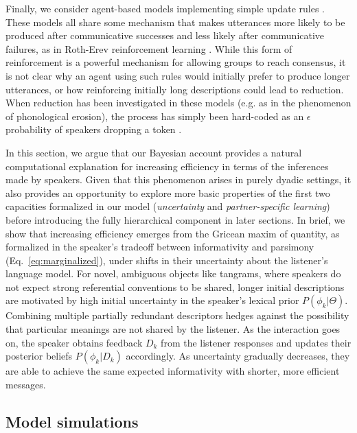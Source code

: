 Finally, we consider agent-based models implementing simple update rules \cite{steels_self-organizing_1995,barr_establishing_2004,young_evolution_2015}.
These models all share some mechanism that makes utterances more likely to be produced after communicative successes and less likely after communicative failures, as in Roth-Erev reinforcement learning \cite{erev1998predicting}.
While this form of reinforcement is a powerful mechanism for allowing groups to reach consensus, it is not clear why an agent using such rules would initially prefer to produce longer utterances, or how reinforcing initially long descriptions could lead to reduction. %
When reduction has been investigated in these models (e.g. as in the phenomenon of phonological erosion), the process has simply been hard-coded as an $\epsilon$ probability of speakers dropping a token \cite{beuls2013agent,steels2016agent}.

In this section, we argue that our Bayesian account provides a natural computational explanation for increasing efficiency in terms of the inferences made by speakers.
Given that this phenomenon arises in purely dyadic settings, it also provides an opportunity to explore more basic properties of the first two capacities formalized in our model (\emph{uncertainty} and \emph{partner-specific learning}) before introducing the fully hierarchical component in later sections. 
In brief, we show that increasing efficiency emerges from the Gricean maxim of quantity, as formalized in the speaker's tradeoff between informativity and parsimony (Eq.~\ref{eq:marginalized}), under shifts in their uncertainty about the listener's language model. 
For novel, ambiguous objects like tangrams, where speakers do not expect strong referential conventions to be shared, longer initial descriptions are motivated by high initial uncertainty in the speaker's lexical prior $P(\phi_k | \Theta)$. 
Combining multiple partially redundant descriptors hedges against the possibility that particular meanings are not shared by the listener.
As the interaction goes on, the speaker obtains feedback $D_k$ from the listener responses and updates their posterior beliefs $P(\phi_k | D_k)$ accordingly. 
As uncertainty gradually decreases, they are able to achieve the same expected informativity with shorter, more efficient messages. 

\subsection{Model simulations}

